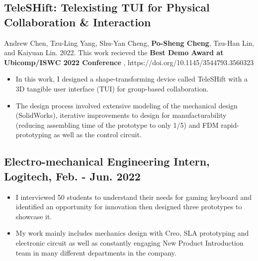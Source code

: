 \documentclass[12pt]{article}
\begin{document}
        \subsection*{TeleSHift: Telexisting TUI for Physical Collaboration \& Interaction}
        {\sffamily
        {\footnotesize Andrew Chen, Tzu-Ling Yang, Shu-Yan Cheng, \textbf{Po-Sheng Cheng}, Tzu-Han Lin, and Kaiyuan Lin. 2022. This work recieved the \textbf{Best Demo Award at Ubicomp/ISWC 2022 Conference}%
        , https://doi.org/10.1145/3544793.3560323}
        \begin{itemize}
            \item In this work, I designed a shape-transforming device called TeleSHift with a 3D tangible user interface (TUI) for group-based collaboration.
            \item The design process involved extensive modeling of the mechanical design (SolidWorks), iterative improvements to design for manufacturability (reducing assembling time of the prototype to only 1/5) and FDM rapid-prototyping as well as the control circuit.
        \end{itemize}
        }
        \subsection*{Electro-mechanical Engineering Intern, Logitech, Feb. - Jun. 2022}
        {\sffamily
        \begin{itemize}
            \item I interviewed 50 students to understand their needs for gaming keyboard and identified an opportunity for innovation then designed three prototypes to showcase it.
            \item My work mainly includes mechanics design with Creo, SLA prototyping and electronic circuit as well as constantly engaging New Product Introduction team in many different departments in the company.
        \end{itemize}
        }
\end{document}

